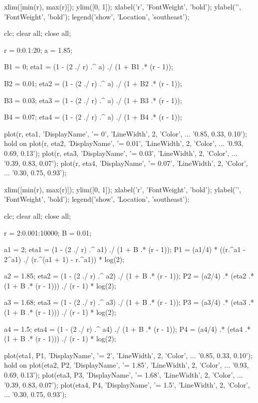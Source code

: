 \begin{verbatim*}
xlim([min(r), max(r)]);
ylim([0, 1]);
xlabel('r', 'FontWeight', 'bold');
ylabel('\eta', 'FontWeight', 'bold');
legend('show', 'Location', 'southeast');

clc; clear all; close all;

r = 0:0.1:20;
a = 1.85;

B1 = 0;
eta1 = (1 - (2 ./ r) .^ a) ./ (1 + B1 .* (r - 1));

B2 = 0.01;
eta2 = (1 - (2 ./ r) .^ a) ./ (1 + B2 .* (r - 1));

B3 = 0.03;
eta3 = (1 - (2 ./ r) .^ a) ./ (1 + B3 .* (r - 1));

B4 = 0.07;
eta4 = (1 - (2 ./ r) .^ a) ./ (1 + B4 .* (r - 1));

plot(r, eta1, 'DisplayName', '\beta = 0', 'LineWidth', 2, 'Color', ...
    '0.85, 0.33, 0.10');
hold on
plot(r, eta2, 'DisplayName', '\beta = 0.01', 'LineWidth', 2, 'Color', ...
    '0.93, 0.69, 0.13');
plot(r, eta3, 'DisplayName', '\beta = 0.03', 'LineWidth', 2, 'Color', ...
    '0.39, 0.83, 0.07');
plot(r, eta4, 'DisplayName', '\beta = 0.07', 'LineWidth', 2, 'Color', ...
    '0.30, 0.75, 0.93');

xlim([min(r), max(r)]);
ylim([0, 1]);
xlabel('r', 'FontWeight', 'bold');
ylabel('\eta', 'FontWeight', 'bold');
legend('show', 'Location', 'southeast');

clc; clear all; close all;

r = 2:0.001:10000;
B = 0.01;

a1 = 2;
eta1 = (1 - (2 ./ r) .^ a1) ./ (1 + B .* (r - 1));
P1 = (a1/4) * ((r.^a1 - 2^a1) ./ (r.^(a1 + 1) - r.^a1)) * log(2);

a2 = 1.85;
eta2 = (1 - (2 ./ r) .^ a2) ./ (1 + B .* (r - 1));
P2 = (a2/4) .* (eta2 .* (1 + B .* (r - 1))) ./ (r - 1) * log(2);

a3 = 1.68;
eta3 = (1 - (2 ./ r) .^ a3) ./ (1 + B .* (r - 1));
P3 = (a3/4) .* (eta3 .* (1 + B .* (r - 1))) ./ (r - 1) * log(2);

a4 = 1.5;
eta4 = (1 - (2 ./ r) .^ a4) ./ (1 + B .* (r - 1));
P4 = (a4/4) .* (eta4 .* (1 + B .* (r - 1))) ./ (r - 1) * log(2);

plot(eta1, P1, 'DisplayName', '\alpha = 2', 'LineWidth', 2, 'Color', ...
    '0.85, 0.33, 0.10');
hold on
plot(eta2, P2, 'DisplayName', '\alpha = 1.85', 'LineWidth', 2, 'Color', ...
    '0.93, 0.69, 0.13');
plot(eta3, P3, 'DisplayName', '\alpha = 1.68', 'LineWidth', 2, 'Color', ...
    '0.39, 0.83, 0.07');
plot(eta4, P4, 'DisplayName', '\alpha = 1.5', 'LineWidth', 2, 'Color', ...
    '0.30, 0.75, 0.93');


\end{verbatim*}
